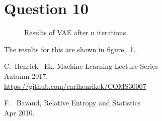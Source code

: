 \documentclass[]{article}
\begin{document}
    \section*{Question 10}
        \begin{figure}[h]
            \centering
            \caption{Results of VAE after n iterations.}
            \label{fig:q10}
        \end{figure}
        \par The results for this are shown in figure ~\ref{fig:q10}.


    \begin{thebibliography}{1}
    
        C.~Henrick ~Ek,  Machine Learning Lecture Series\\
        Autumn 2017. \\
        \url{https://github.com/carlhenrikek/COMS30007}

        F. ~Bavaud,  Relative Entropy and Statistics\\
        Apr 2010.
    
    \end{thebibliography}
    
    
\end{document}
